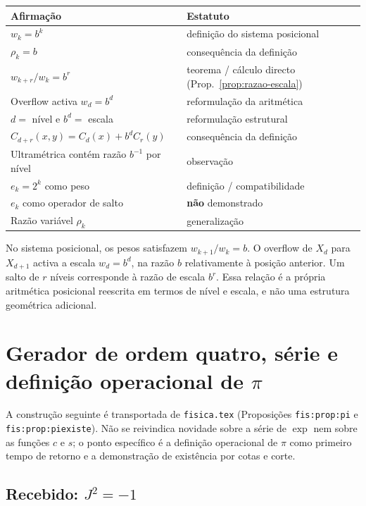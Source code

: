 \documentclass[11pt,a4paper]{article}
\begin{document}
\begin{center}
\small
\begin{tabular}{@{}p{}p{}@{}}
\toprule
Afirmação & Estatuto \\
\midrule
\(w_k=b^k\) & definição do sistema posicional \\
\(\rho_k=b\) & consequência da definição \\
\(w_{k+r}/w_k=b^r\) & teorema / cálculo directo (Prop.~\ref{prop:razao-escala}) \\
Overflow activa \(w_d=b^d\) & reformulação da aritmética \\
\(d=\) nível e \(b^d=\) escala & reformulação estrutural \\
\(C_{d+r}(x,y)=C_d(x)+b^d C_r(y)\) & consequência da definição \\
Ultramétrica contém razão \(b^{-1}\) por nível & observação \\
\(e_k=2^k\) como peso & definição / compatibilidade \\
\(e_k\) como operador de salto & \textbf{não} demonstrado \\
Razão variável \(\rho_k\) & generalização \\
\bottomrule
\end{tabular}
\end{center}

No sistema posicional, os pesos satisfazem \(w_{k+1}/w_k=b\). O overflow de \(X_d\) para \(X_{d+1}\) activa a escala \(w_d=b^d\), na razão \(b\) relativamente à posição anterior. Um salto de \(r\) níveis corresponde à razão de escala \(b^r\). Essa relação é a própria aritmética posicional reescrita em termos de nível e escala, e não uma estrutura geométrica adicional.

\section{Gerador de ordem quatro, série e definição operacional de \(\pi\)}
\label{sec:pi-operacional}

A construção seguinte é transportada de \texttt{fisica.tex} (Proposições \texttt{fis:prop:pi} e \texttt{fis:prop:piexiste}). Não se reivindica novidade sobre a série de \(\exp\) nem sobre as funções \(c\) e \(s\); o ponto específico é a definição operacional de \(\pi\) como primeiro tempo de retorno e a demonstração de existência por cotas e corte.

\subsection{Recebido: \(J^2=-1\)}
\end{document}
